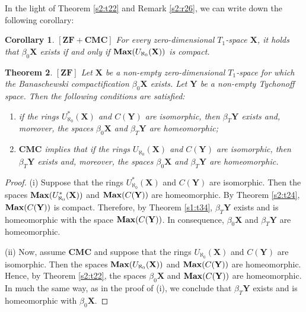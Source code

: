 \documentclass[12pt,twoside,leqno]{article}
\theoremstyle{plain}
\newtheorem{theorem}{Theorem}[section]
\newtheorem{corollary}[theorem]{Corollary}
\theoremstyle{definition}
\theoremstyle{remark}
\DeclareMathOperator{\BMax}{\bf{Max}}
\begin{document}
In the light of Theorem \ref{s2:t22} and Remark \ref{s2:r26}, we can write down the following corollary:

\begin{corollary}
	\label{s2:c28}
	$[\mathbf{ZF+CMC}]$  For every zero-dimensional $T_1$-space $\mathbf{X}$, it holds that $\beta_0\mathbf{X}$ exists if and only if $\BMax(U_{\aleph_0}(\mathbf{X}))$ is compact.
\end{corollary}

\begin{theorem}
	\label{s2:t29}
	$[\mathbf{ZF}]$
	Let $\mathbf{X}$ be a non-empty zero-dimensional $T_1$-space for which the Banaschewski compactification $\beta_0\mathbf{X}$ exists. Let $\mathbf{Y}$ be a non-empty Tychonoff space. Then the following conditions are satisfied:
	\begin{enumerate}
		\item[(i)] if the rings $U_{\aleph_0}^{\ast}(\mathbf{X})$ and $C(\mathbf{Y})$ are isomorphic, then $\beta_T\mathbf{Y}$  exists and, moreover, the spaces $\beta_0\mathbf{X}$ and $\beta_T\mathbf{Y}$ are homeomorphic;
		\item[(ii)] $\mathbf{CMC}$ implies that if the rings $U_{\aleph_0}(\mathbf{X})$ and $C(\mathbf{Y})$ are isomorphic, then $\beta_T\mathbf{Y}$ exists and, moreover, the spaces  $\beta_0\mathbf{X}$ and $\beta_T\mathbf{Y}$ are homeomorphic.
	\end{enumerate}
\end{theorem}

\begin{proof}
	(i) Suppose that the rings $U_{\aleph_0}^{\ast}(\mathbf{X})$ and $C(\mathbf{Y})$ are isomorphic. Then the spaces $\BMax(U_{\aleph_0}^{\ast}(\mathbf{X}))$ and $\BMax(C(\mathbf{Y}))$ are homeomorphic. By Theorem \ref{s2:t24}, $\BMax(C(\mathbf{Y}))$ is compact. Therefore, by Theorem \ref{s1:t34}, $\beta_T\mathbf{Y}$ exists and is homeomorphic with the space $\BMax(C(\mathbf{Y}))$. In consequence, $\beta_0\mathbf{X}$ and $\beta_T\mathbf{Y}$ are homeomorphic.\medskip
	
	(ii) Now, assume $\mathbf{CMC}$ and suppose that the rings $U_{\aleph_0}(\mathbf{X})$ and $C(\mathbf{Y})$ are isomorphic. Then the spaces $\BMax(U_{\aleph_0}(\mathbf{X}))$ and $\BMax(C(\mathbf{Y}))$ are homeomorphic. Hence, by Theorem \ref{s2:t22}, the spaces $\beta_0\mathbf{X}$ and $\BMax(C(\mathbf{Y}))$ are homeomorphic. In much the same way, as in the proof of (i), we conclude that $\beta_T\mathbf{Y}$ exists and is homeomorphic with $\beta_0\mathbf{X}$.
\end{proof}
\end{document}
